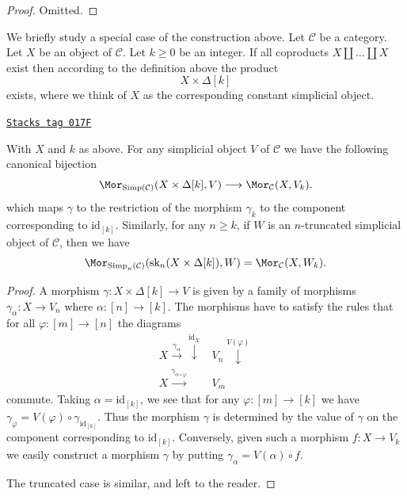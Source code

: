 \begin{proof}
Omitted.
\end{proof}

We briefly study a special case of the construction
above. Let $\mathcal{C}$ be a category.
Let $X$ be an object of $\mathcal{C}$.
Let $k \geq 0$ be an integer.
If all coproducts $X \amalg \ldots \amalg X$ exist
then according to the definition above the product
$$
X \times \Delta[k]
$$
exists, where we think of $X$ as the corresponding constant
simplicial object.

\begin{lemma}
\label{simplicial-lemma-morphism-from-coproduct}
\href{https://stacks.math.columbia.edu/tag/017F}{\texttt{Stacks tag 017F}}

With $X$ and $k$ as above.
For any simplicial object $V$ of
$\mathcal{C}$ we have the following
canonical bijection
$$
\Mor_{\text{Simp}(\mathcal{C})}(X \times \Delta[k], V)
\longrightarrow
\Mor_\mathcal{C}(X, V_k).
$$
which maps $\gamma$ to the restriction of the
morphism $\gamma_k$ to the component corresponding
to $\text{id}_{[k]}$.
Similarly, for any $n \geq k$, if $W$ is an
$n$-truncated simplicial object
of $\mathcal{C}$, then we have
$$
\Mor_{\text{Simp}_n(\mathcal{C})}(\text{sk}_n(X \times \Delta[k]), W)
=
\Mor_\mathcal{C}(X, W_k).
$$
\end{lemma}

\begin{proof}
A morphism $\gamma : X \times \Delta[k] \to V$ is given by
a family of morphisms $\gamma_\alpha : X \to V_n$ where
$\alpha : [n] \to [k]$. The morphisms have to satisfy the
rules that for all $\varphi : [m] \to [n]$ the diagrams
$$
\begin{array}{cc}X \overset{\gamma_\alpha}{\longrightarrow}\overset{\text{id}_X}{\downarrow} & V_n \overset{V(\varphi)}{\downarrow} \\ X \overset{\gamma_{\alpha \circ \varphi}}{\longrightarrow} & V_m\end{array}
$$
commute. Taking $\alpha = \text{id}_{[k]}$, we see that
for any $\varphi : [m] \to [k]$ we have $\gamma_\varphi =
V(\varphi) \circ \gamma_{\text{id}_{[k]}}$. Thus the morphism
$\gamma$ is determined by the value of $\gamma$ on the
component corresponding to $\text{id}_{[k]}$. Conversely,
given such a morphism $f : X \to V_k$ we easily
construct a morphism $\gamma$ by putting
$\gamma_\alpha = V(\alpha) \circ f$.

\medskip\noindent
The truncated case is similar, and left to the reader.
\end{proof}

